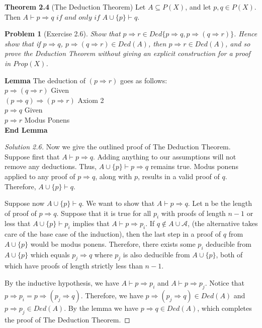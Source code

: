 \documentclass{article}
\theoremstyle{problemstyle}
\newtheorem{problem}{Problem}
\begin{document}
\begin{flushleft}
\textbf{Theorem 2.4} (The Deduction Theorem) Let $A \subseteq P(X)$, and let $p,q \in P(X)$. Then $A\vdash p\Rightarrow q$ $if$ $and$ $only$ $if$ $A \cup \{p\}\vdash q$.
\end{flushleft}

\begin{problem}[Exercise 2.6]
Show that $p \Rightarrow r \in Ded\{p\Rightarrow q, p \Rightarrow (q\Rightarrow r)\}$. Hence show that if $p \Rightarrow q$, $p \Rightarrow (q\Rightarrow r) \in Ded(A)$, then $p \Rightarrow r \in Ded(A)$, and so prove the Deduction Theorem without giving an explicit construction for a proof in $Prop(X)$. 
\end{problem}

\begin{flushleft}
\textbf{Lemma}
The deduction of $(p \Rightarrow r)$ goes as follows:\\
$p \Rightarrow (q \Rightarrow r)$                               Given\\
$(p \Rightarrow q) \Rightarrow (p \Rightarrow r)$             Axiom 2\\
$p \Rightarrow q$                                               Given\\
$p \Rightarrow r$                                        Modus Ponens\\
\textbf{End Lemma}
\end{flushleft}

\begin{proof}[Solution 2.6]
Now we give the outlined proof of The Deduction Theorem. Suppose first that $A \vdash p \Rightarrow q$. Adding anything to our assumptions will not remove any deductions. Thus, $A \cup \{p\} \vdash p \Rightarrow q$ remains true. Modus ponens applied to any proof of $p \Rightarrow q$, along with $p$, results in a valid proof of $q$. Therefore, $A \cup \{p\} \vdash q$. 

Suppose now $A \cup \{p\} \vdash q$. We want to show that $A \vdash p \Rightarrow q$. Let n be the length of proof of $p \Rightarrow q$. Suppose that it is true for all $p_i$ with proofs of length $n-1$ or less that $A \cup \{p\} \vdash p_i$ implies that $A \vdash p \Rightarrow p_i$. If $q \notin A \cup \mathscr{A}$, (the alternative takes care of the base case of the induction), then the last step in a proof of $q$ from $A \cup \{p\}$ would be modus ponens. Therefore, there exists some $p_i$ deducible from $A \cup \{p\}$ which equals $p_j \Rightarrow q$ where $p_j$ is also deducible from $A \cup \{p\}$, both of which have proofs of length strictly less than $n-1$. 

By the inductive hypothesis, we have $A \vdash p \Rightarrow p_i$ and $A \vdash p \Rightarrow p_j$. Notice that $p \Rightarrow p_i = p \Rightarrow (p_j \Rightarrow q)$. Therefore, we have $p \Rightarrow (p_j \Rightarrow q) \in Ded(A)$ and $p \Rightarrow p_j \in Ded(A)$. By the lemma we have $p\Rightarrow q \in Ded(A)$, which completes the proof of The Deduction Theorem. 
\end{proof}
\end{document}
